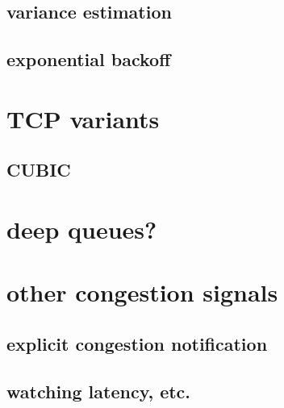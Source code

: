 \subsection{variance estimation}


\subsection{exponential backoff}


\section{TCP variants}


\subsection{CUBIC}



\section{deep queues?}


\section{other congestion signals}



\subsection{explicit congestion notification}


\subsection{watching latency, etc.}


